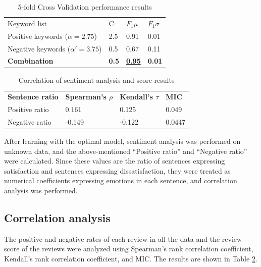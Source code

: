 \documentclass[review]{elsarticle}
\begin{document}
\begin{table}[th]
\centering
\caption{5-fold Cross Validation performance results}
\label{tab:kfold_performance}
\begin{tabular}{llll}
Keyword list                & C            & \(F_1 \mu\)       & \(F_1 \sigma\) \\
Positive keywords (\(\alpha=2.75\))  & 2.5          & 0.91                & 0.01           \\
Negative keywords (\(\alpha'=3.75\)) & 0.5          & 0.67                & 0.11           \\
\rowcolor{DeepGreen}\color{white}\textbf{Combination}
                                     & \textbf{0.5} & {\ul \textbf{0.95}} & \textbf{0.01}
\end{tabular}
\end{table}

\begin{table}[th]
\centering
\caption{Correlation of sentiment analysis and score results}
\label{tab:res_correl}
\begin{tabular}{llll}
\textbf{Sentence ratio} & \textbf{Spearman's \(\rho\)} & \textbf{Kendall's \(\tau\)} & \textbf{MIC} \\
Positive ratio     & 0.161            & 0.125            & 0.049        \\
Negative ratio     & -0.149           & -0.122           & 0.0447      
\end{tabular}
\end{table}

After learning with the optimal model, sentiment analysis was performed on unknown data, and the above-mentioned ``Positive ratio'' and ``Negative ratio'' were calculated. Since these values are the ratio of sentences expressing satisfaction and sentences expressing dissatisfaction, they were treated as numerical coefficients expressing emotions in each sentence, and correlation analysis was performed.

\subsection{Correlation analysis}\label{res_correls}

The positive and negative rates of each review in all the data and the review score of the reviews were analyzed using Spearman's rank correlation coefficient, Kendall's rank correlation coefficient, and MIC. The results are shown in Table \ref{tab:res_correl}.
\end{document}
